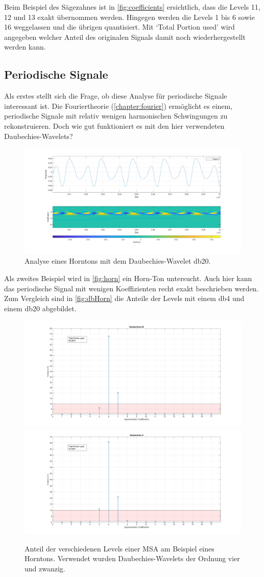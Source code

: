 \begin{refsection}
Beim Beispiel des Sägezahnes ist in \autoref{fig:coefficients} ersichtlich, dass die Levels 11, 12 und 13 exakt übernommen werden.
Hingegen werden die Levels 1 bis 6 sowie 16 weggelassen und die übrigen quantisiert.
Mit `Total Portion used' wird angegeben welcher Anteil des originalen Signals damit noch wiederhergestellt werden kann.

\subsection{Periodische Signale}
Als erstes stellt sich die Frage, ob diese Analyse für periodische Signale interessant ist.
Die Fouriertheorie (\autoref{chapter:fourier}) ermöglicht es einem, periodische Signale mit relativ wenigen harmonischen Schwingungen zu rekonstruieren.
Doch wie gut funktioniert es mit den hier verwendeten Daubechies-Wavelets?

\begin{figure}
	\centering
	\includegraphics[width=\linewidth]{papers/compress/Bilder/frenchHorn_normal.pdf}
	\caption{Analyse eines Horntons mit dem Daubechies-Wavelet db20.}
	\label{fig:horn}
\end{figure}

Als zweites Beispiel wird in \autoref{fig:horn} ein Horn-Ton untersucht.
Auch hier kann das periodische Signal mit wenigen Koeffizienten recht exakt beschrieben werden. 
Zum Vergleich sind in \autoref{fig:dbHorn} die Anteile der Levels mit einem db4 und einem db20 abgebildet.
\begin{figure}
	\includegraphics[width=0.5\linewidth]{papers/compress/Bilder/frenchHorn_db20.pdf}
	\includegraphics[width=0.5\linewidth]{papers/compress/Bilder/frenchHorn_db4.pdf}
	\caption{Anteil der verschiedenen Levels einer MSA am Beispiel eines Horntons. Verwendet wurden Daubechies-Wavelets der Ordnung vier und zwanzig.}
	\label{fig:dbHorn}
\end{figure}


\end{refsection}
